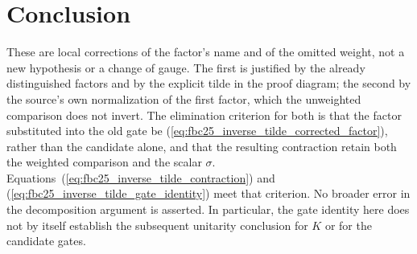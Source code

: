 \documentclass{article}
\begin{document}
\section{Conclusion}

These are local corrections of the factor's name and of the omitted weight, not a new hypothesis or a change of gauge. The first is justified by the already distinguished factors and by the explicit tilde in the proof diagram; the second by the source's own normalization of the first factor, which the unweighted comparison does not invert. The elimination criterion for both is that the factor substituted into the old gate be
(\ref{eq:fbc25_inverse_tilde_corrected_factor}), rather than the candidate alone, and that the resulting contraction retain both the weighted comparison and the scalar $\sigma$. Equations~(\ref{eq:fbc25_inverse_tilde_contraction}) and
(\ref{eq:fbc25_inverse_tilde_gate_identity}) meet that criterion.
No broader error in the decomposition argument is asserted. In particular, the gate identity here does not by itself establish the subsequent unitarity conclusion for $K$ or for the candidate gates.



\end{document}

